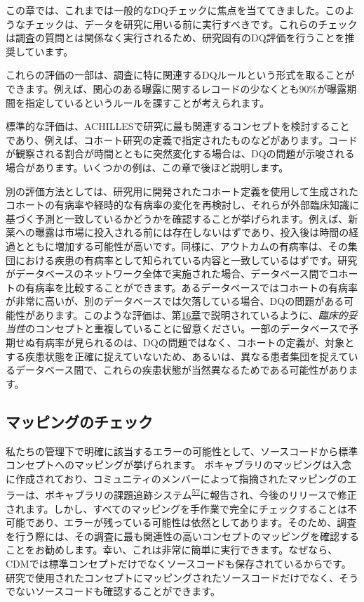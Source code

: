 \documentclass[
  11pt]{book}
\theoremstyle{definition}
\theoremstyle{definition}
\theoremstyle{definition}
\theoremstyle{definition}
\theoremstyle{remark}
\begin{document}
この章では、これまでは一般的なDQチェックに焦点を当ててきました。このようなチェックは、データを研究に用いる前に実行すべきです。これらのチェックは調査の質問とは関係なく実行されるため、研究固有のDQ評価を行うことを推奨しています。

これらの評価の一部は、調査に特に関連するDQルールという形式を取ることができます。例えば、関心のある曝露に関するレコードの少なくとも90\%が曝露期間を指定しているというルールを課すことが考えられます。

標準的な評価は、ACHILLESで研究に最も関連するコンセプトを検討することであり、例えば、コホート研究の定義で指定されたものなどがあります。コードが観察される割合が時間とともに突然変化する場合は、DQの問題が示唆される場合があります。いくつかの例は、この章で後ほど説明します。

別の評価方法としては、研究用に開発されたコホート定義を使用して生成されたコホートの有病率や経時的な有病率の変化を再検討し、それらが外部臨床知識に基づく予測と一致しているかどうかを確認することが挙げられます。例えば、新薬への曝露は市場に投入される前には存在しないはずであり、投入後は時間の経過とともに増加する可能性が高いです。同様に、アウトカムの有病率は、その集団における疾患の有病率として知られている内容と一致しているはずです。研究がデータベースのネットワーク全体で実施された場合、データベース間でコホートの有病率を比較することができます。あるデータベースではコホートの有病率が非常に高いが、別のデータベースでは欠落している場合、DQの問題がある可能性があります。このような評価は、第\href{https://ohdsi.github.io/TheBookOfOhdsi/ClinicalValidity.html\#ClinicalValidity}{16章}で説明されているように、\emph{臨床的妥当性}のコンセプトと重複していることに留意ください。一部のデータベースで予期せぬ有病率が見られるのは、DQの問題ではなく、コホートの定義が、対象とする疾患状態を正確に捉えていないため、あるいは、異なる患者集団を捉えているデータベース間で、これらの疾患状態が当然異なるためである可能性があります。

\subsection{マッピングのチェック}\label{ux30deux30c3ux30d4ux30f3ux30b0ux306eux30c1ux30a7ux30c3ux30af}

私たちの管理下で明確に該当するエラーの可能性として、ソースコードから標準コンセプトへのマッピングが挙げられます。 ボキャブラリのマッピングは入念に作成されており、コミュニティのメンバーによって指摘されたマッピングのエラーは、ボキャブラリの課題追跡システム\textsuperscript{\href{https://ohdsi.github.io/TheBookOfOhdsi/DataQuality.html\#fn57}{57}}に報告され、今後のリリースで修正されます。しかし、すべてのマッピングを手作業で完全にチェックすることは不可能であり、エラーが残っている可能性は依然としてあります。そのため、調査を行う際には、その調査に最も関連性の高いコンセプトのマッピングを確認することをお勧めします。幸い、これは非常に簡単に実行できます。なぜなら、CDMでは標準コンセプトだけでなくソースコードも保存されているからです。研究で使用されたコンセプトにマッピングされたソースコードだけでなく、そうでないソースコードも確認することができます。
\end{document}
